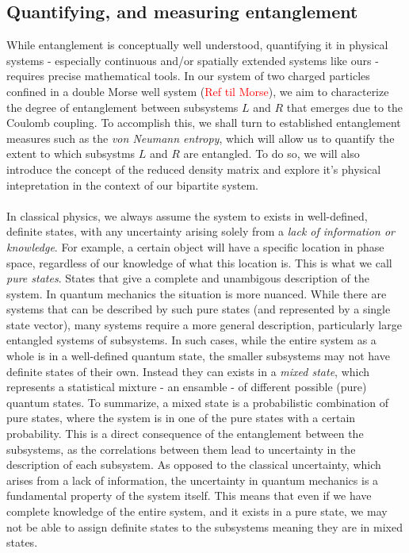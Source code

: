 \documentclass{subfiles}
\begin{document}
\subsection{Quantifying, and measuring entanglement}
While entanglement is conceptually well understood, quantifying it in physical systems - especially continuous and/or spatially extended systems like ours - requires precise mathematical tools. In our system of two charged particles confined in a double Morse well system (\textcolor{red}{Ref til Morse}), we aim to characterize the degree of entanglement between subsystems $L$ and $R$ that emerges due to the Coulomb coupling. To accomplish this, we shall turn to established entanglement measures such as the \emph{von Neumann entropy}, which will allow us to quantify the extent to which subsystms $L$ and $R$ are entangled. To do so, we will also introduce the concept of the reduced density matrix and explore it's physical intepretation in the context of our bipartite system.
\\ \\
In classical physics, we always assume the system to exists in well-defined, definite states, with any uncertainty arising solely from a \emph{lack of information or knowledge}. For example, a certain object will have a specific location in phase space, regardless of our knowledge of what this location is. This is what we call \emph{pure states}. States that give a complete and unambigous description of the system. In quantum mechanics the situation is more nuanced. While there are systems that can be described by such pure states (and represented by a single state vector), many systems require a more general description, particularly large entangled systems of subsystems. In such cases, while the entire system as a whole is in a well-defined quantum state, the smaller subsystems may not have definite states of their own. Instead they can exists in a \emph{mixed state}, which represents a statistical mixture - an ensamble - of different possible (pure) quantum states.
To summarize, a mixed state is a probabilistic combination of pure states, where the system is in one of the pure states with a certain probability. This is a direct consequence of the entanglement between the subsystems, as the correlations between them lead to uncertainty in the description of each subsystem. As opposed to the classical uncertainty, which arises from a lack of information, the uncertainty in quantum mechanics is a fundamental property of the system itself. This means that even if we have complete knowledge of the entire system, and it exists in a pure state, we may not be able to assign definite states to the subsystems meaning they are in mixed states. 
\end{document}

